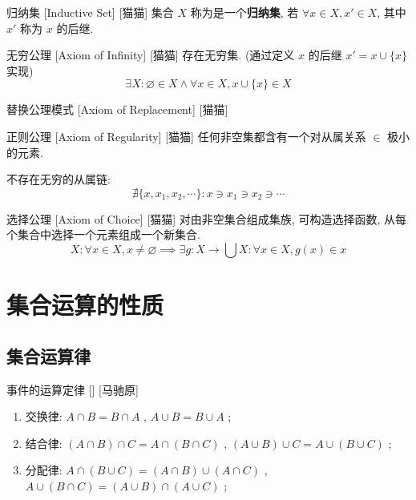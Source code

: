 \documentclass[UTF8]{ctexart}
\begin{document}
    \begin{dfn}
        []
        {归纳集}
        [Inductive Set]
        [猫猫]
        集合 \(X\) 称为是一个\textbf{归纳集}, 若 \(\forall x\in X, x'\in X\), 其中 \(x'\) 称为 \(x\) 的后继. 
    \end{dfn}
    
    \begin{axm}
        []
        {无穷公理}
        [Axiom of Infinity]
        [猫猫]
        存在无穷集. (通过定义 \(x\) 的后继 \(x'=x\cup\{x\}\) 实现)
        \[\exists X: \varnothing\in X\wedge\forall x\in X, x\cup\{x\}\in X\]
    \end{axm}
    
    \begin{axm}
        []
        {替换公理模式}
        [Axiom of Replacement]
        [猫猫]
    \end{axm}
    
    \begin{axm}
        []
        {正则公理}
        [Axiom of Regularity]
        [猫猫]
        任何非空集都含有一个对从属关系 \(\in\) 极小的元素. 
    \end{axm}
    
    \begin{thm}
        {}
        不存在无穷的从属链: 
        \[\nexists \{x,x_1,x_2,\cdots\}: x\ni x_1\ni x_2\ni \cdots\]
    \end{thm}
    
    \begin{axm}
        []
        {选择公理}
        [Axiom of Choice]
        [猫猫]
        对由非空集合组成集族, 可构造选择函数, 从每个集合中选择一个元素组成一个新集合. 
        \[X: \forall x\in X, x\neq\varnothing\implies\exists g:X\to\bigcup X: \forall x\in X, g(x)\in x\]
    \end{axm}
    
\section{集合运算的性质}

    \subsection{集合运算律}

        \begin{ppt}
            []
            {事件的运算定律}
            []
            [马驰原]
            \begin{enumerate}
                \item 交换律:  \(A\cap B=B\cap A\) ,  \(A\cup B=B\cup A\) ; 
                \item 结合律:  \((A\cap B)\cap C=A\cap(B\cap C)\) ,  \((A\cup B)\cup C=A\cup(B\cup C)\) ; 
                \item 分配律:  \(A\cap(B\cup C)=(A\cap B)\cup(A\cap C)\) ,  \(A\cup(B\cap C)=(A\cup B)\cap(A\cup C)\) ; 
            \end{enumerate}
        \end{ppt}
\end{document}
